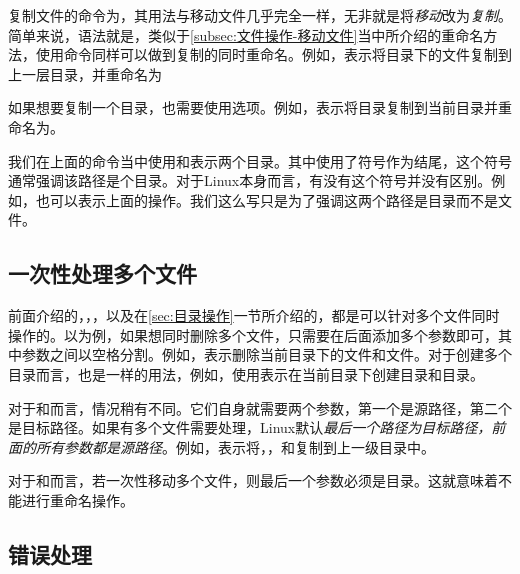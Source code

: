 复制文件的命令为，其用法与移动文件几乎完全一样，无非就是将\emph{移动}改为\emph{复制}。简单来说，语法就是，类似于\ref{subsec:文件操作-移动文件}当中所介绍的重命名方法，使用命令同样可以做到复制的同时重命名。例如，表示将目录下的文件复制到上一层目录，并重命名为

如果想要复制一个目录，也需要使用选项。例如，表示将目录复制到当前目录并重命名为。

\begin{attention}
    我们在上面的命令当中使用和表示两个目录。其中使用了符号\code{/}作为结尾，这个符号通常强调该路径是个目录。对于Linux本身而言，有没有这个符号并没有区别。例如，也可以表示上面的操作。我们这么写只是为了强调这两个路径是目录而不是文件。
\end{attention}

\subsection{一次性处理多个文件}\label{subsec:文件操作-一次性处理多个文件}

前面介绍的，，，以及在\ref{sec:目录操作}一节所介绍的，都是可以针对多个文件同时操作的。以为例，如果想同时删除多个文件，只需要在后面添加多个参数即可，其中参数之间以空格分割。例如，表示删除当前目录下的文件和文件。对于创建多个目录而言，也是一样的用法，例如，使用表示在当前目录下创建目录和目录。

对于和而言，情况稍有不同。它们自身就需要两个参数，第一个是源路径，第二个是目标路径。如果有多个文件需要处理，Linux默认\emph{最后一个路径为目标路径，前面的所有参数都是源路径}。例如，表示将，，和复制到上一级目录中。

\begin{attention}
    对于和而言，若一次性移动多个文件，则最后一个参数必须是目录。这就意味着不能进行重命名操作。
\end{attention}


\subsection{错误处理}\label{subsec:文件操作-错误处理}

